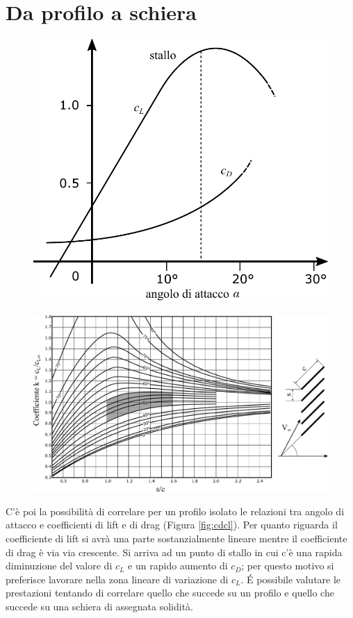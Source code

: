 \section{Da profilo a schiera} 
\begin{figure}
\centering
\begin{minipage}{.3\textwidth}
  \centering
  \includegraphics[width=.95\linewidth]{fig/cdcl.pdf}
  \label{fig:cdcl}
\end{minipage}%
\begin{minipage}{.7\textwidth}
  \centering
  \includegraphics[width=.95\linewidth]{fig/EffSchiera.pdf}
  \label{fig:EffSchiera}
\end{minipage}
\end{figure}
C'è poi la possibilità di correlare per un profilo isolato le relazioni tra angolo di attacco e coefficienti di lift e di drag (Figura \ref{fig:cdcl}). Per quanto riguarda il coefficiente di lift si avrà una parte sostanzialmente lineare mentre il coefficiente di drag è via via crescente. Si arriva ad un punto di stallo in cui c'è una rapida diminuzione del valore di $c_L$ e un rapido aumento di $c_D$; per questo motivo si preferisce lavorare nella zona lineare di variazione di $c_L$. \'E possibile valutare le prestazioni tentando di correlare quello che succede su un profilo e quello che succede su una schiera di assegnata solidità.\\

